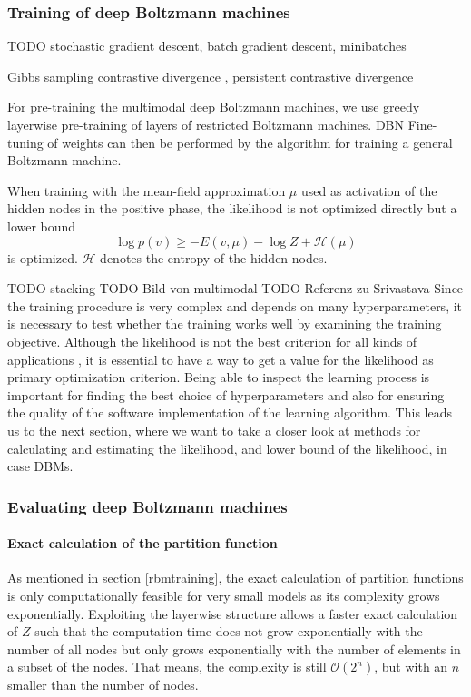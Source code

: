\documentclass[12pt]{article}
\begin{document}
\subsubsection{Training of deep Boltzmann machines}
TODO stochastic gradient descent, batch gradient descent, minibatches \citep{bengio2012practical}

Gibbs sampling \citep{gibbssamplingorig}
contrastive divergence \citep{cdorig, perpinan_contrastive_2005} , persistent contrastive divergence

For pre-training the multimodal deep Boltzmann machines, we use greedy layerwise pre-training  of layers of restricted Boltzmann machines.
DBN \citep{hinton_reducing_2006}
Fine-tuning of weights can then be performed by the algorithm for training a general Boltzmann machine.
\citep{salakhutdinov2009DBMs, salakhutdinov2015generativemodels}

When training with the mean-field approximation $\mu$ used as activation of the hidden nodes in the positive phase,
the likelihood is not optimized directly but a lower bound
\[
   \log p(v) \geq - E(v, \mu) - \log Z + \mathcal{H}(\mu)
\]
is optimized. $\mathcal{H}$ denotes the entropy of the hidden nodes. \citep{sala2012anefficient}

TODO stacking
TODO Bild von multimodal
TODO Referenz zu Srivastava
Since the training procedure is very complex and depends on many hyperparameters, it is necessary to test whether the training works well by examining the training objective.
Although the likelihood is not the best criterion for all kinds of applications \citep{theis_note_2015}, it is essential to have a way to get a value for the likelihood as primary optimization criterion.
Being able to inspect the learning process is important for finding the best choice of hyperparameters and also for ensuring the quality of the software implementation of the learning algorithm.
This leads us to the next section, where we want to take a closer look at methods for calculating and estimating the likelihood, and lower bound of the likelihood, in case DBMs.


\subsubsection{Evaluating deep Boltzmann machines}
\paragraph{Exact calculation of the partition function}
\label{methodExactloglik}
As mentioned in section \ref{rbmtraining}, the exact calculation of partition functions is only computationally feasible for very small models as its complexity grows exponentially. Exploiting the layerwise structure allows a faster exact calculation of $Z$ such that the computation time does not grow exponentially with the number of all nodes but only grows exponentially with the number of elements in a subset of the nodes. That means, the complexity is still $\mathcal{O}(2^n)$, but with an $n$ smaller than the number of nodes.
\end{document}
